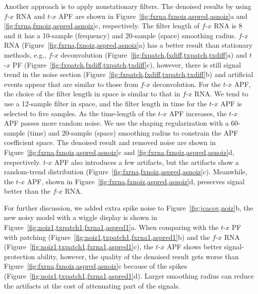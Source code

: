 Another approach is to apply nonstationary filters. The denoised
results by using $f$-$x$ RNA and $t$-$x$ APF are shown in
Figure~\ref{fig:fxrna,fxnoiz,aspred,asnoiz}a and
\ref{fig:fxrna,fxnoiz,aspred,asnoiz}c, respectively. The filter length
of $f$-$x$ RNA is 8 and it has a 10-sample (frequency) and 20-sample
(space) smoothing radius. $f$-$x$ RNA
(Figure~\ref{fig:fxrna,fxnoiz,aspred,asnoiz}a) has a better result
than stationary methods, e.g., $f$-$x$ deconvolution
(Figure~\ref{fig:fxpatch,fxdiff,txpatch,txdiff}a) and $t$-$x$ PF
(Figure~\ref{fig:fxpatch,fxdiff,txpatch,txdiff}c), however, there is
still signal trend in the noise section
(Figure~\ref{fig:fxpatch,fxdiff,txpatch,txdiff}b) and artificial
events appear that are similar to those from $f$-$x$
deconvolution. For the $t$-$x$ APF, the choice of the filter length in
space is similar to that in $f$-$x$ RNA. We tend to use a 12-sample
filter in space, and the filter length in time for the $t$-$x$ APF is
selected to five samples.  As the time-length of the $t$-$x$ APF
increases, the $t$-$x$ APF passes more random noise. We use the
shaping regularization with a 60-sample (time) and 20-sample (space)
smoothing radius to constrain the APF coefficient space. The denoised
result and removed noise are shown in
Figure~\ref{fig:fxrna,fxnoiz,aspred,asnoiz}c and
\ref{fig:fxrna,fxnoiz,aspred,asnoiz}d, respectively. $t$-$x$ APF also
introduces a few artifacts, but the artifacts show a random-trend
distribution
(Figure~\ref{fig:fxrna,fxnoiz,aspred,asnoiz}c). Meanwhile, the $t$-$x$
APF, shown in Figure~\ref{fig:fxrna,fxnoiz,aspred,asnoiz}d, preserves
signal better than the $f$-$x$ RNA.




For further discussion, we added extra spike noise to
Figure~\ref{fig:jcacov,noiz}b, the new noisy model with a wiggle display
is shown in Figure~\ref{fig:noiz1,txpatch1,fxrna1,aspred1}a. When
comparing with the $t$-$x$ PF with patching
(Figure~\ref{fig:noiz1,txpatch1,fxrna1,aspred1}b) and the $f$-$x$ RNA
(Figure~\ref{fig:noiz1,txpatch1,fxrna1,aspred1}c), the $t$-$x$ APF
shows better signal-protection ability, however, the quality of the
denoised result gets worse than
Figure~\ref{fig:fxrna,fxnoiz,aspred,asnoiz}c because of the spikes
(Figure~\ref{fig:noiz1,txpatch1,fxrna1,aspred1}d). Larger smoothing
radius can reduce the artifacts at the cost of attenuating part of the
signals.

